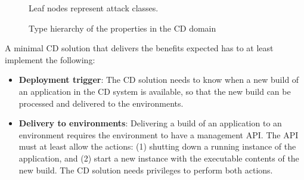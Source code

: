 \begin{figure}[h]
\caption{Type hierarchy of the properties in the CD domain}
\medskip
\small
\centering 
Leaf nodes represent attack classes\footnotemark.
\label{fig:th}
\end{figure}

\pagebreak[3]
A minimal \acrshort{CD} solution that delivers the benefits expected has to at least implement the following:

\begin{itemize}
    \item \textbf{Deployment trigger}: The \acrshort{CD} solution needs to know when a new build of an application in the \acrshort{CD} system is available, so that the new build can be processed and delivered to the environments.
    \item \textbf{Delivery to environments}: Delivering a build of an application to an environment requires the environment to have a management \acrshort{API}. The \acrshort{API} must at least allow the actions: (1) shutting down a running instance of the application, and (2) start a new instance with the executable contents of the new build. The \acrshort{CD} solution needs privileges to perform both actions.
\end{itemize}


